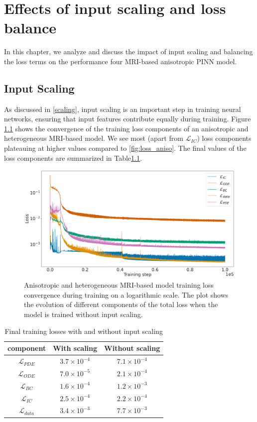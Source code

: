 \chapter{Effects of input scaling and loss balance}
In this chapter, we analyze and discuss the impact of input scaling and balancing the loss terms on the performance four MRI-based anisotropic PINN model. 
\section{Input Scaling}
As discussed in \ref{scaling}, input scaling is an important step in training neural networks, ensuring that input features contribute equally during training.
Figure \ref{fig:loss_aniso_no_scaling} shows the convergence of the training loss components of an anisotropic and heterogeneous MRI-based model. We see most (apart from $\mathcal{L}_{IC}$) loss components plateauing at higher values compared to \ref{fig:loss_aniso}. The final values of the loss components are summarized in Table\ref{tab:scaling}.
\begin{figure}[H]
  \centering
  \includegraphics[width=\linewidth]{Figs/Anisotropic/loss_all_noscaling.pdf}
  \caption{Anisotropic and heterogeneous MRI-based model training loss convergence during training on a logarithmic scale. The plot shows the evolution of different components of the total loss when the model is trained without input scaling.}
  \label{fig:loss_aniso_no_scaling}
\end{figure}
\begin{table}[h]
  \centering
  \begin{tabular}{|c|c|c|}
    \hline
    component & With scaling & Without scaling \\ \hline
    $\mathcal{L}_{PDE}$  & $3.7\times 10^{-4}$  & $7.1\times 10^{-4}$  \\ \hline
    $\mathcal{L}_{ODE}$  & $7.0\times 10^{-5}$   & $2.1\times 10^{-4}$  \\ \hline
    $\mathcal{L}_{BC}$  & $1.6\times 10^{-4}$   & $1.2\times 10^{-3}$  \\ \hline
    $\mathcal{L}_{IC}$  & $2.5\times 10^{-4}$  & $2.2\times 10^{-4}$  \\ \hline
    $\mathcal{L}_{data}$ & $3.4\times 10^{-3}$  & $7.7\times 10^{-3}$  \\ \hline
    
  \end{tabular}
  \caption{Final training losses with and without input scaling}
  \label{tab:scaling}
\end{table}
